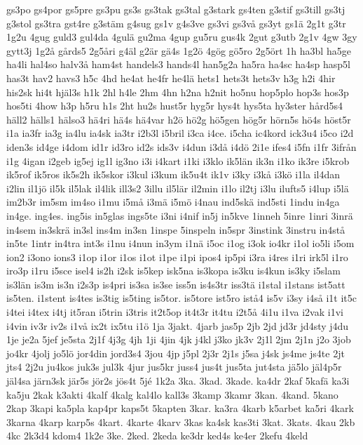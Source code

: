 {gs3po
gs4por
gs5pre
gs3pu
gs3s
gs3tak
gs3tal
g3stark
gs4ten
g3stif
gs3till
gs3tj
g3stol
gs3tra
gst4re
g3stäm
g4sug
gs1v
g4s3ve
gs3vi
gs3vå
gs3yt
gs1ä
2g1t
g3tr
1g2u
4gug
guld3
gul4da
4gulä
gu2ma
4gup
gu5ru
gus4k
2gut
g3utb
2g1v
4gw
3gy
gytt3j
1g2å
gårds5
2g5åri
g4äl
g2är
gä4s
1g2ö
4gög
gö5ro
2g5ört
1h
ha3bl
ha5ge
ha4li
hal4so
halv3å
ham4st
handels3
hands4l
han5g2a
ha5ra
ha4sc
ha4sp
hasp5l
has3t
hav2
havs3
h5c
4hd
he4at
he4fr
he4lä
hets1
hets3t
hets3v
h3g
h2i
4hir
his2sk
hi4t
hjäl3s
h1k
2hl
h4le
2hm
4hn
h2na
h2nit
ho5nu
hop5plo
hop3s
hos3p
hos5ti
4how
h3p
h5ru
h1s
2ht
hu2s
hust5r
hyg5r
hys4t
hys5ta
hy3ster
hård5s4
häll2
hälls1
hälso3
hä4ri
hä4s
hä4var
h2ö
hö2g
hö5gen
hög5r
hörn5s
hö4s
höst5r
i1a
ia3fr
ia3g
ia4lu
ia4sk
ia3tr
i2b3l
i5bril
i3ca
i4ce.
i5cha
ic4kord
ick3u4
i5co
i2d
iden3s
id4ge
i4dom
id1r
id3ro
id2s
ids3v
i4dun
i3då
i4dö
2i1e
ifes4
i5fn
i1fr
3ifrån
i1g
4igan
i2geb
ig5ej
ig1l
ig3no
i3i
i4kart
i1ki
i3klo
ik5län
ik3n
i1ko
ik3re
i5krob
ik5rof
ik5ros
ik5s2h
ik5skor
i3kul
i3kum
ik5u4t
ik1v
i3ky
i3kå
i3kö
i1la
il4dan
i2lin
il1jö
il5k
il5lak
il4lik
ill3s2
3illu
il5lär
il2min
i1lo
il2tj
i3lu
ilufts5
i4lup
i5lä
im2b3r
im5sm
im4so
i1mu
i5må
i3mä
i5mö
i4nau
ind5skä
ind5sti
1indu
in4ga
in4ge.
ing4es.
ing5is
in5glas
ings5te
i3ni
i4nif
in5j
in5kve
1inneh
5inre
1inri
3inrä
in4sem
in3skrä
in3sl
ins4m
in3sn
1inspe
5inspeln
in5spr
3instink
3instru
in4stå
in5te
1intr
in4tra
int3s
i1nu
i4nun
in3ym
i1nä
i5oc
i1og
i3ok
io4kr
i1ol
io5li
i5om
ion2
i3ono
ions3
i1op
i1or
i1os
i1ot
i1pe
i1pi
ipos4
ip5pi
i3ra
i4res
i1ri
irk5l
i1ro
iro3p
i1ru
i5sce
isel4
is2h
i2sk
is5kep
isk5na
is3kopa
is3ku
is4kun
is3ky
i5slam
is3län
is3m
is3n
i2s3p
is4pri
is3sa
is3se
iss5n
is4s3tr
iss3tä
i1stal
i1stans
ist5att
is5ten.
i1stent
is4tes
is3tig
is5ting
is5tor.
is5tore
ist5ro
istå4
is5v
i3sy
i4så
i1t
it5c
i4tei
i4tex
i4tj
it5ran
i5trin
i3tris
it2t5op
it4t3r
it4tu
i2t5å
4i1u
i1va
i2vak
i1vi
i4vin
iv3r
iv2s
i1vå
ix2t
ix5tu
i1ö
1ja
3jakt.
4jarb
jas5p
2jb
2jd
jd3r
jd4sty
j4du
1je
je2a
5jef
je5sta
2j1f
4j3g
4jh
1ji
4jin
4jk
j4kl
j3ko
jk3v
2j1l
2jm
2j1n
j2o
3job
jo4kr
4jolj
jo5lö
jor4din
jord3s4
3jou
4jp
j5pl
2j3r
2j1s
j5sa
j4sk
js4me
js4te
2jt
jts4
2j2u
ju4kos
juk3s
jul3k
4jur
jus5kr
juss4
jus4t
jus5ta
jut4sta
jä5lo
jäl4p5r
jäl4sa
järn3sk
jär5s
jör2s
jös4t
5jé
1k2a
3ka.
3kad.
3kade.
ka4dr
2kaf
5kafä
ka3i
ka5ju
2kak
k3akti
4kalf
4kalg
kal4lo
kall3s
3kamp
3kamr
3kan.
4kand.
5kano
2kap
3kapi
ka5pla
kap4pr
kaps5t
5kapten
3kar.
ka3ra
4karb
k5arbet
ka5ri
4kark
3karna
4karp
karp5s
4kart.
4karte
4karv
3kas
ka4sk
kas3ti
3kat.
3kats.
4kau
2kb
4kc
2k3d4
kdom4
1k2e
3ke.
2ked.
2keda
ke3dr
ked4s
ke4er
2kefu
4keld
}
